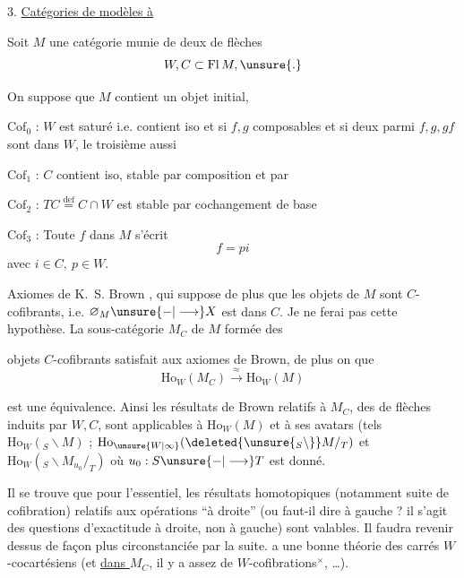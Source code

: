 
3. \uline{Catégories de modèles à }

Soit $M$ une catégorie munie de deux  de flèches
\[
 W,C\subset\mathrm{Fl}\,M,\unsure{.}
\]

On suppose que $M$ contient un objet initial, 

 $\mathrm{Cof}_{0}$ : $W$ est  saturé i.e. contient iso et si $f,g$ composables et si deux parmi $f,g,gf$ sont dans $W$, le troisième aussi

$\mathrm{Cof}_{1}$ : $C$ contient iso, stable par composition et par  

$\mathrm{Cof}_{2}$ : $TC\overset{\mathrm{def}}{=}C\cap W$ est stable par cochangement de base

$\mathrm{Cof}_{3}$ : Toute  $f$ dans $M$ s'écrit
\[
 f=pi
\]
avec $i\in C,\ p\in W$.

 Axiomes de K.~S. Brown , qui suppose de plus que les objets de $M$ sont $C$-cofibrants, i.e. $\varnothing_M\unsure{\mathbin{-}|\longrightarrow} X$ est dans $C$. Je ne ferai pas cette hypothèse. La sous-catégorie $M_C$  de $M$ formée des

objets $C$-cofibrants satisfait aux axiomes de Brown, de plus on   que
\[
 \mathrm{Ho}_{W}(M_C)\xrightarrow{\approx}\mathrm{Ho}_{W}(M)
\]

est une équivalence. Ainsi les résultats de Brown relatifs à $M_C$,  des  de flèches induits par $W,C$, sont applicables à $\mathrm{Ho}_W(M)$ et à ses avatars (tels $\mathrm{Ho}_W({}_S\backslash M)$ ; $\mathrm{Ho}_{\unsure{W|\infty}}(\deleted{\unsure{{}_S\backslash}}M/_{T})$ et $\mathrm{Ho}_{W}({}_S\backslash M_{u_0}/_{T})$ où $u_0:S\unsure{\mathbin{-}|\longrightarrow} T$ est donné.

Il se trouve que pour l'essentiel, les résultats homotopiques  (notamment suite  de cofibration) relatifs aux opérations  ``à droite'' (ou faut-il dire à gauche ? il s'agit  des questions d'exactitude à droite, non à gauche) sont valables. Il  faudra revenir dessus de façon plus circonstanciée par la suite.   a une bonne théorie des carrés $W$-cocartésiens (et \uline{dans $M_C$}, il y a assez de $W$-cofibrations$^{\times}$, \ldots).

